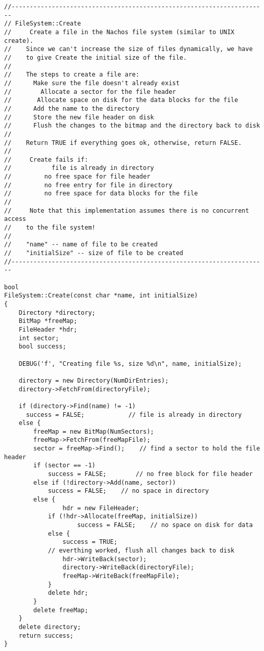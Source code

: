 \documentclass[a4paper,10pt]{article}
\begin{document}
\begin{lstlisting}
//----------------------------------------------------------------------
// FileSystem::Create
//     Create a file in the Nachos file system (similar to UNIX create).
//    Since we can't increase the size of files dynamically, we have
//    to give Create the initial size of the file.
//
//    The steps to create a file are:
//      Make sure the file doesn't already exist
//        Allocate a sector for the file header
//       Allocate space on disk for the data blocks for the file
//      Add the name to the directory
//      Store the new file header on disk
//      Flush the changes to the bitmap and the directory back to disk
//
//    Return TRUE if everything goes ok, otherwise, return FALSE.
//
//     Create fails if:
//           file is already in directory
//         no free space for file header
//         no free entry for file in directory
//         no free space for data blocks for the file
//
//     Note that this implementation assumes there is no concurrent access
//    to the file system!
//
//    "name" -- name of file to be created
//    "initialSize" -- size of file to be created
//----------------------------------------------------------------------

bool
FileSystem::Create(const char *name, int initialSize)
{
    Directory *directory;
    BitMap *freeMap;
    FileHeader *hdr;
    int sector;
    bool success;

    DEBUG('f', "Creating file %s, size %d\n", name, initialSize);

    directory = new Directory(NumDirEntries);
    directory->FetchFrom(directoryFile);

    if (directory->Find(name) != -1)
      success = FALSE;            // file is already in directory
    else {
        freeMap = new BitMap(NumSectors);
        freeMap->FetchFrom(freeMapFile);
        sector = freeMap->Find();    // find a sector to hold the file header
        if (sector == -1)
            success = FALSE;        // no free block for file header
        else if (!directory->Add(name, sector))
            success = FALSE;    // no space in directory
        else {
                hdr = new FileHeader;
            if (!hdr->Allocate(freeMap, initialSize))
                    success = FALSE;    // no space on disk for data
            else {
                success = TRUE;
            // everthing worked, flush all changes back to disk
                hdr->WriteBack(sector);
                directory->WriteBack(directoryFile);
                freeMap->WriteBack(freeMapFile);
            }
            delete hdr;
        }
        delete freeMap;
    }
    delete directory;
    return success;
}


\end{lstlisting}
\end{document}
